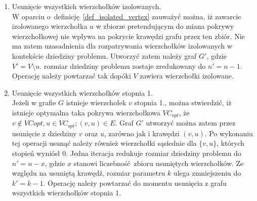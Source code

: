 \begin{enumerate}
  \item Usunięcie wszystkich wierzchołków izolowanych. \\
    W oparciu o~definicję~\ref{def_isolated_vertex} zauważyć można, iż zawarcie
    izolowanego wierzchołka $u$ w zbiorze pretendującym do miana pokrywy
    wierzchołkowej nie wpływa na pokrycie krawędzi grafu przez ten zbiór.
    Nie ma zatem uzasadnienia dla rozpatrywania wierzchołków izolowanych w
    kontekście dziedziny problemu.
    Utworzyć zatem należy graf $G\prime$, gdzie $V\prime = V
    \setminus u$.
    rozmiar dziedziny problemu zostaje zredukowany do $n\prime=n-1$.
    Operację należy powtarzać tak dopóki $V$ zawiera wierzchołki izolowane.

  \item Usunięcie wszystkich wierzchołków stopnia 1.\\
    Jeżeli w grafie $G$ istnieje wierzchołek $v$ stopnia 1., można 
    stwierdzić, iż istnieje optymalna taka pokrywa wierzchołkowa $VC_{opt}$, że
    $v \notin VC{opt}, u \in VC_{opt}; (v,u) \in E$.
    Graf $G\prime$ utworzyć można zatem przez usunięcie z dziedziny $v$ oraz
    $u$, zarówno jak i krawędzi $(v,u)$.
    Po wykonaniu tej operacji usunąć należy również wierzchołki sąsiednie dla
    $\{v,u\}$, których stopień wyniósł 0.
    Jedna iteracja redukuje rozmiar dziedziny problemu do $n\prime=n-x$, gdzie
    $x$ stanowi liczebność~zbioru usuniętych wierzchołków.
    Ze względu na usuniętą krawędź, rozmiar parametru $k$ ulega zmniejszeniu do
    $k\prime=k-1$.
    Operację należy powtarzać do momentu usunięcia z grafu wszystkich
    wierzchołków stopnia 1.


\end{enumerate}
